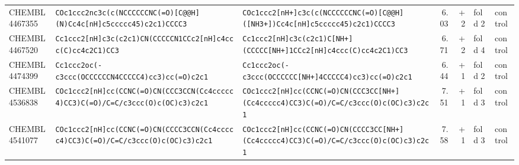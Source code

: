 \begin{longtable}{l p{4.4cm} p{4.4cm} r r l l}
CHEMBL4467355 & \texttt{COc1ccc2nc3c(\allowbreak{}c(\allowbreak{}NCCCCCCNC(\allowbreak{}=\allowbreak{}O)\allowbreak{}[C@@H]\allowbreak{}(\allowbreak{}N)\allowbreak{}Cc4c[nH]\allowbreak{}c5ccccc45)\allowbreak{}c2c1)\allowbreak{}CCCC3} & \texttt{COc1ccc2[nH+]\allowbreak{}c3c(\allowbreak{}c(\allowbreak{}NCCCCCCNC(\allowbreak{}=\allowbreak{}O)\allowbreak{}[C@@H]\allowbreak{}(\allowbreak{}[NH3+]\allowbreak{})\allowbreak{}Cc4c[nH]\allowbreak{}c5ccccc45)\allowbreak{}c2c1)\allowbreak{}CCCC3} & 6.03 & +2 & fold 2 & control \\
CHEMBL4467520 & \texttt{Cc1ccc2[nH]\allowbreak{}c3c(\allowbreak{}c2c1)\allowbreak{}CN(\allowbreak{}CCCCCN1CCc2[nH]\allowbreak{}c4ccc(\allowbreak{}C)\allowbreak{}cc4c2C1)\allowbreak{}CC3} & \texttt{Cc1ccc2[nH]\allowbreak{}c3c(\allowbreak{}c2c1)\allowbreak{}C[NH+]\allowbreak{}(\allowbreak{}CCCCC[NH+]\allowbreak{}1CCc2[nH]\allowbreak{}c4ccc(\allowbreak{}C)\allowbreak{}cc4c2C1)\allowbreak{}CC3} & 6.71 & +2 & fold 4 & control \\
CHEMBL4474399 & \texttt{Cc1ccc2oc(\allowbreak{}-c3ccc(\allowbreak{}OCCCCCCN4CCCCC4)\allowbreak{}cc3)\allowbreak{}cc(\allowbreak{}=\allowbreak{}O)\allowbreak{}c2c1} & \texttt{Cc1ccc2oc(\allowbreak{}-c3ccc(\allowbreak{}OCCCCCC[NH+]\allowbreak{}4CCCCC4)\allowbreak{}cc3)\allowbreak{}cc(\allowbreak{}=\allowbreak{}O)\allowbreak{}c2c1} & 6.44 & +1 & fold 2 & control \\
CHEMBL4536838 & \texttt{COc1ccc2[nH]\allowbreak{}cc(\allowbreak{}CCNC(\allowbreak{}=\allowbreak{}O)\allowbreak{}CN(\allowbreak{}CCC3CCN(\allowbreak{}Cc4ccccc4)\allowbreak{}CC3)\allowbreak{}C(\allowbreak{}=\allowbreak{}O)\allowbreak{}/\allowbreak{}C=\allowbreak{}C/\allowbreak{}c3ccc(\allowbreak{}O)\allowbreak{}c(\allowbreak{}OC)\allowbreak{}c3)\allowbreak{}c2c1} & \texttt{COc1ccc2[nH]\allowbreak{}cc(\allowbreak{}CCNC(\allowbreak{}=\allowbreak{}O)\allowbreak{}CN(\allowbreak{}CCC3CC[NH+]\allowbreak{}(\allowbreak{}Cc4ccccc4)\allowbreak{}CC3)\allowbreak{}C(\allowbreak{}=\allowbreak{}O)\allowbreak{}/\allowbreak{}C=\allowbreak{}C/\allowbreak{}c3ccc(\allowbreak{}O)\allowbreak{}c(\allowbreak{}OC)\allowbreak{}c3)\allowbreak{}c2c1} & 7.51 & +1 & fold 3 & control \\
CHEMBL4541077 & \texttt{COc1ccc2[nH]\allowbreak{}cc(\allowbreak{}CCNC(\allowbreak{}=\allowbreak{}O)\allowbreak{}CN(\allowbreak{}CCCC3CCN(\allowbreak{}Cc4ccccc4)\allowbreak{}CC3)\allowbreak{}C(\allowbreak{}=\allowbreak{}O)\allowbreak{}/\allowbreak{}C=\allowbreak{}C/\allowbreak{}c3ccc(\allowbreak{}O)\allowbreak{}c(\allowbreak{}OC)\allowbreak{}c3)\allowbreak{}c2c1} & \texttt{COc1ccc2[nH]\allowbreak{}cc(\allowbreak{}CCNC(\allowbreak{}=\allowbreak{}O)\allowbreak{}CN(\allowbreak{}CCCC3CC[NH+]\allowbreak{}(\allowbreak{}Cc4ccccc4)\allowbreak{}CC3)\allowbreak{}C(\allowbreak{}=\allowbreak{}O)\allowbreak{}/\allowbreak{}C=\allowbreak{}C/\allowbreak{}c3ccc(\allowbreak{}O)\allowbreak{}c(\allowbreak{}OC)\allowbreak{}c3)\allowbreak{}c2c1} & 7.58 & +1 & fold 3 & control \\

\end{longtable}
